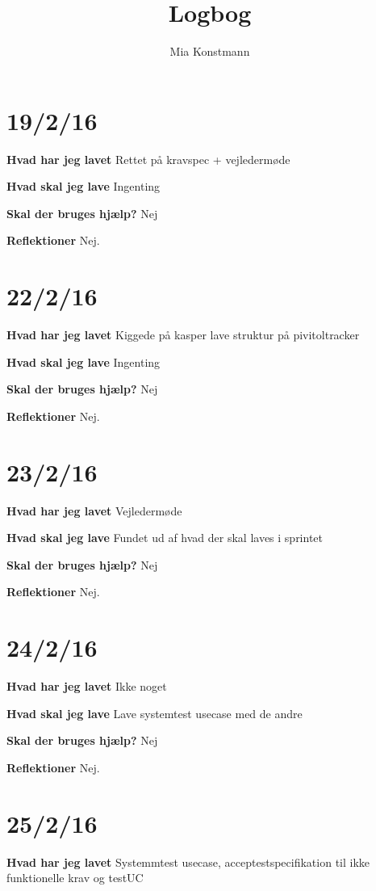 \documentclass{article}
\title{Logbog}
\author{Mia Konstmann}
\date{}
\begin{document}
	\maketitle
	\tableofcontents
	
	\section{19/2/16}
	\textbf{Hvad har jeg lavet}
	Rettet på kravspec + vejledermøde
	
	\textbf{Hvad skal jeg lave}
	Ingenting
	
	\textbf{Skal der bruges hjælp?}
	Nej
	
	\textbf{Reflektioner}
	Nej.
	
	\section{22/2/16}
	\textbf{Hvad har jeg lavet}
	Kiggede på kasper lave struktur på pivitoltracker
	
	\textbf{Hvad skal jeg lave}
	Ingenting
	
	\textbf{Skal der bruges hjælp?}
	Nej
	
	\textbf{Reflektioner}
	Nej.
	
	\section{23/2/16}
	\textbf{Hvad har jeg lavet}
	Vejledermøde
	
	\textbf{Hvad skal jeg lave}
	Fundet ud af hvad der skal laves i sprintet
	
	\textbf{Skal der bruges hjælp?}
	Nej
	
	\textbf{Reflektioner}
	Nej.
	
	\section{24/2/16}
	\textbf{Hvad har jeg lavet}
	Ikke noget
	
	\textbf{Hvad skal jeg lave}
	Lave systemtest usecase med de andre
	
	\textbf{Skal der bruges hjælp?}
	Nej
	
	\textbf{Reflektioner}
	Nej.	
	
	\section{25/2/16}
	\textbf{Hvad har jeg lavet}
	Systemmtest usecase, acceptestspecifikation til ikke funktionelle krav og testUC
	
\end{document}
